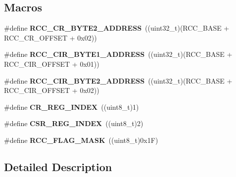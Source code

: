 \subsection*{Macros}
\begin{DoxyCompactItemize}
\item 
\hypertarget{group___r_c_c___private___constants_ga1da336203f39dd57462e7f331271f699}{\#define {\bfseries R\-C\-C\-\_\-\-C\-R\-\_\-\-B\-Y\-T\-E2\-\_\-\-A\-D\-D\-R\-E\-S\-S}~((uint32\-\_\-t)(R\-C\-C\-\_\-\-B\-A\-S\-E + R\-C\-C\-\_\-\-C\-R\-\_\-\-O\-F\-F\-S\-E\-T + 0x02))}\label{group___r_c_c___private___constants_ga1da336203f39dd57462e7f331271f699}

\item 
\hypertarget{group___r_c_c___private___constants_ga97f80d22ba3506a43accbeb9ceb31f51}{\#define {\bfseries R\-C\-C\-\_\-\-C\-I\-R\-\_\-\-B\-Y\-T\-E1\-\_\-\-A\-D\-D\-R\-E\-S\-S}~((uint32\-\_\-t)(R\-C\-C\-\_\-\-B\-A\-S\-E + R\-C\-C\-\_\-\-C\-I\-R\-\_\-\-O\-F\-F\-S\-E\-T + 0x01))}\label{group___r_c_c___private___constants_ga97f80d22ba3506a43accbeb9ceb31f51}

\item 
\hypertarget{group___r_c_c___private___constants_ga1387fb2dfadb830eb83ab2772c8d2294}{\#define {\bfseries R\-C\-C\-\_\-\-C\-I\-R\-\_\-\-B\-Y\-T\-E2\-\_\-\-A\-D\-D\-R\-E\-S\-S}~((uint32\-\_\-t)(R\-C\-C\-\_\-\-B\-A\-S\-E + R\-C\-C\-\_\-\-C\-I\-R\-\_\-\-O\-F\-F\-S\-E\-T + 0x02))}\label{group___r_c_c___private___constants_ga1387fb2dfadb830eb83ab2772c8d2294}

\item 
\hypertarget{group___r_c_c___private___constants_ga56feb1abcd35b22427fa55164c585afa}{\#define {\bfseries C\-R\-\_\-\-R\-E\-G\-\_\-\-I\-N\-D\-E\-X}~((uint8\-\_\-t)1)}\label{group___r_c_c___private___constants_ga56feb1abcd35b22427fa55164c585afa}

\item 
\hypertarget{group___r_c_c___private___constants_gab9507f2d9ee5d477b11363b052cd07c8}{\#define {\bfseries C\-S\-R\-\_\-\-R\-E\-G\-\_\-\-I\-N\-D\-E\-X}~((uint8\-\_\-t)2)}\label{group___r_c_c___private___constants_gab9507f2d9ee5d477b11363b052cd07c8}

\item 
\hypertarget{group___r_c_c___private___constants_ga80017c6bf8a5c6f53a1a21bb8db93a82}{\#define {\bfseries R\-C\-C\-\_\-\-F\-L\-A\-G\-\_\-\-M\-A\-S\-K}~((uint8\-\_\-t)0x1\-F)}\label{group___r_c_c___private___constants_ga80017c6bf8a5c6f53a1a21bb8db93a82}

\end{DoxyCompactItemize}


\subsection{Detailed Description}
